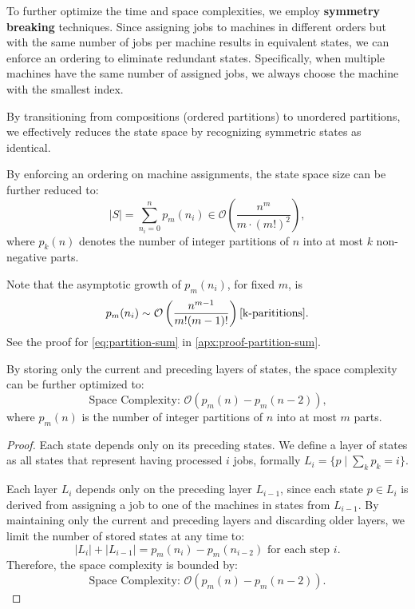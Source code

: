 To further optimize the time and space complexities, we employ \textbf{symmetry breaking} techniques. Since assigning jobs to machines in different orders but with the same number of jobs per machine results in equivalent states, we can enforce an ordering to eliminate redundant states. Specifically, when multiple machines have the same number of assigned jobs, we always choose the machine with the smallest index.

By transitioning from compositions (ordered partitions) to unordered partitions, we effectively reduces the state space by recognizing symmetric states as identical.

\begin{lemma} \label{lemma:symmetry-breaking}
    By enforcing an ordering on machine assignments, the state space size can be further reduced to:
    \begin{equation} \label{eq:partition-sum}
        |S| = \sum_{n_i=0}^n p_m(n_i) \in \mathcal{O}\left( \frac{n^m}{m \cdot (m!)^2} \right),
    \end{equation}
    where $p_k(n)$ denotes the number of integer partitions of $n$ into at most $k$ non-negative parts.
\end{lemma}

Note that the asymptotic growth of $p_m(n_i)$, for fixed $m$, is
\[
    p_m(n_i) \sim \mathcal{O}\left( \frac{n^{m - 1}}{m!(m-1)!} \right) \cite{k-parititions}\text{.}
\]
See the proof for \autoref{eq:partition-sum} in \ref{apx:proof-partition-sum}.

\begin{lemma} \label{lemma:space-layer-by-layer}
    By storing only the current and preceding layers of states, the space complexity can be further optimized to:
    \[
        \text{Space Complexity: } \mathcal{O}\left( p_m(n) - p_m(n-2) \right)\text{,}
    \]
    where $p_m(n)$ is the number of integer partitions of $n$ into at most $m$ parts.
\end{lemma}

\begin{proof}
    Each state depends only on its preceding states. We define a layer of states as all states that represent having processed $i$ jobs, formally $L_i = \{ p \mid \sum_k p_k = i \}$. 
    
    Each layer $L_i$ depends only on the preceding layer $L_{i-1}$, since each state $p \in L_i$ is derived from assigning a job to one of the machines in states from $L_{i-1}$. By maintaining only the current and preceding layers and discarding older layers, we limit the number of stored states at any time to:
    \[
        |L_i| + |L_{i-1}| = p_m(n_i) - p_m(n_{i-2}) \text{ for each step } i.
    \]
    Therefore, the space complexity is bounded by:
    \[
        \text{Space Complexity: } \mathcal{O}\left( p_m(n) - p_m(n-2) \right)\text{.}
    \]
\end{proof}

